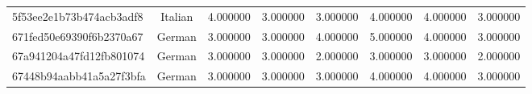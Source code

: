 \begin{table}[htbp]
\begin{tabular}{lccccccc}
5f53ee2e1b73b474acb3adf8 & Italian & 4.000000 & 3.000000 & 3.000000 & 4.000000 & 4.000000 & 3.000000 \\
671fed50e69390f6b2370a67 & German & 3.000000 & 3.000000 & 4.000000 & 5.000000 & 4.000000 & 3.000000 \\
67a941204a47fd12fb801074 & German & 3.000000 & 3.000000 & 2.000000 & 3.000000 & 3.000000 & 2.000000 \\
67448b94aabb41a5a27f3bfa & German & 3.000000 & 3.000000 & 3.000000 & 4.000000 & 4.000000 & 3.000000 \\
\bottomrule
\end{tabular}
\end{table}
